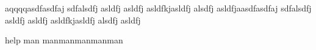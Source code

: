 aqqqqasdfasdfaj sdfalsdfj asldfj asldfj asldfkjasldfj alsdfj asldfjaasdfasdfaj sdfalsdfj asldfj asldfj asldfkjasldfj alsdfj asldfj


help man manmanmanmanman 
